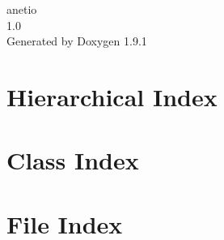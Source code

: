\let\mypdfximage\pdfximage\def\pdfximage{\immediate\mypdfximage}\documentclass[twoside]{book}
\newcommand{\+}{\discretionary{\mbox{\scriptsize$\hookleftarrow$}}{}{}}
\newcommand{\clearemptydoublepage}{%
  \newpage{\pagestyle{empty}\cleardoublepage}%
}
\begin{document}
\raggedbottom

\hypersetup{pageanchor=false,
             bookmarksnumbered=true,
             pdfencoding=unicode
            }
\begin{titlepage}
\vspace*{7cm}
\begin{center}%
{\Large anetio \\[1ex]\large 1.\+0 }\\
\vspace*{1cm}
{\large Generated by Doxygen 1.9.1}\\
\end{center}
\end{titlepage}
\clearemptydoublepage
{}
\tableofcontents
\clearemptydoublepage
{}
\hypersetup{pageanchor=true}

\chapter{Hierarchical Index}

\chapter{Class Index}

\chapter{File Index}

\end{document}
